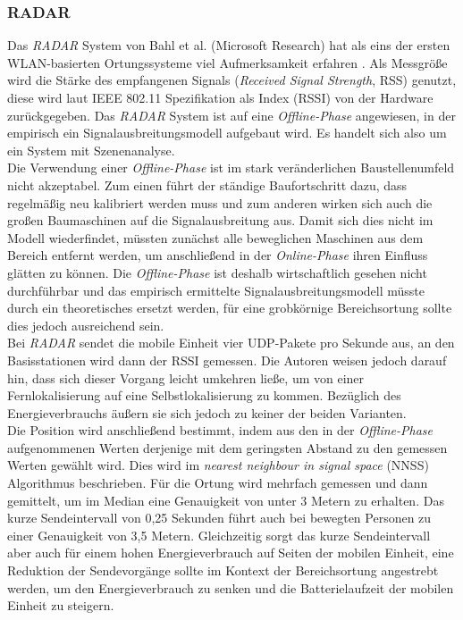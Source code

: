 \subsubsection{RADAR}
\label{ch:Vorherige:sec:RADAR}
Das \emph{RADAR} System von Bahl et al. (Microsoft Research) hat als eins der ersten WLAN-basierten Ortungssysteme viel Aufmerksamkeit erfahren \cite{bahl2000radar}.
Als Messgröße wird die Stärke des empfangenen Signals (\emph{Received Signal Strength}, RSS) genutzt, diese wird laut IEEE 802.11 Spezifikation als Index (RSSI) von der Hardware zurückgegeben. 
Das \emph{RADAR} System ist auf eine \emph{Offline-Phase} angewiesen, in der empirisch ein Signalausbreitungsmodell aufgebaut wird. 
Es handelt sich also um ein System mit Szenenanalyse.\\
Die Verwendung einer \emph{Offline-Phase} ist im stark veränderlichen Baustellenumfeld nicht akzeptabel. 
Zum einen führt der ständige Baufortschritt dazu, dass regelmäßig neu kalibriert werden muss und zum anderen wirken sich auch die großen Baumaschinen auf die Signalausbreitung aus. 
Damit sich dies nicht im Modell wiederfindet, müssten zunächst alle beweglichen Maschinen aus dem Bereich entfernt werden, um anschließend in der \emph{Online-Phase} ihren Einfluss glätten zu können.
Die \emph{Offline-Phase} ist deshalb wirtschaftlich gesehen nicht durchführbar und das empirisch ermittelte Signalausbreitungsmodell müsste durch ein theoretisches ersetzt werden, für eine grobkörnige Bereichsortung sollte dies jedoch ausreichend sein.\\
Bei \emph{RADAR} sendet die mobile Einheit vier UDP-Pakete pro Sekunde aus, an den Basisstationen wird dann der RSSI gemessen.
Die Autoren weisen jedoch darauf hin, dass sich dieser Vorgang leicht umkehren ließe, um von einer Fernlokalisierung auf eine Selbstlokalisierung zu kommen.
Bezüglich des Energieverbrauchs äußern sie sich jedoch zu keiner der beiden Varianten.\\
Die Position wird anschließend bestimmt, indem aus den in der \emph{Offline-Phase} aufgenommenen Werten derjenige mit dem geringsten Abstand zu den gemessen Werten gewählt wird. 
Dies wird im \emph{nearest neighbour in signal space} (NNSS) Algorithmus beschrieben.
Für die Ortung wird mehrfach gemessen und dann gemittelt, um im Median eine Genauigkeit von unter 3 Metern zu erhalten. 
Das kurze Sendeintervall von 0,25 Sekunden führt auch bei bewegten Personen zu einer Genauigkeit von 3,5 Metern.
Gleichzeitig sorgt das kurze Sendeintervall aber auch für einem hohen Energieverbrauch auf Seiten der mobilen Einheit, eine Reduktion der Sendevorgänge sollte im Kontext der Bereichsortung angestrebt werden, um den Energieverbrauch zu senken und die Batterielaufzeit der mobilen Einheit zu steigern.

